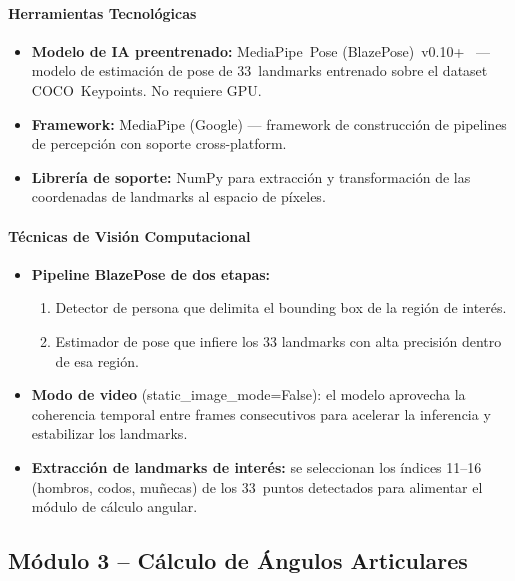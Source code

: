 \paragraph{Herramientas Tecnológicas}
\begin{itemize}[leftmargin=1.5em]
  \item \textbf{Modelo de IA preentrenado:}
        MediaPipe~Pose (BlazePose)~v0.10+~\cite{Bazarevskyetal2020,Lugaresietal2019}
        — modelo de estimación de pose de 33~landmarks entrenado sobre
        el dataset COCO~Keypoints. No requiere GPU.
  \item \textbf{Framework:} MediaPipe (Google) \cite{Lugaresietal2019}
        — framework de construcción de pipelines de percepción con
        soporte cross-platform.
  \item \textbf{Librería de soporte:} NumPy para extracción y
        transformación de las coordenadas de landmarks al espacio de
        píxeles.
\end{itemize}
 
\paragraph{Técnicas de Visión Computacional}
\begin{itemize}[leftmargin=1.5em]
  \item \textbf{Pipeline BlazePose de dos etapas:}
        \begin{enumerate}[leftmargin=2em]
          \item Detector de persona que delimita el bounding
                box de la región de interés.
          \item Estimador de pose que infiere los 33 landmarks con
                alta precisión dentro de esa región.
        \end{enumerate}
  \item \textbf{Modo de video} (static\_image\_mode=False):
        el modelo aprovecha la coherencia temporal entre frames
        consecutivos para acelerar la inferencia y estabilizar los
        landmarks.
  \item \textbf{Extracción de landmarks de interés:} se seleccionan los
        índices 11–16 (hombros, codos, muñecas) de los 33~puntos
        detectados para alimentar el módulo de cálculo angular.
\end{itemize}

\subsection{Módulo 3 -- Cálculo de Ángulos Articulares}
